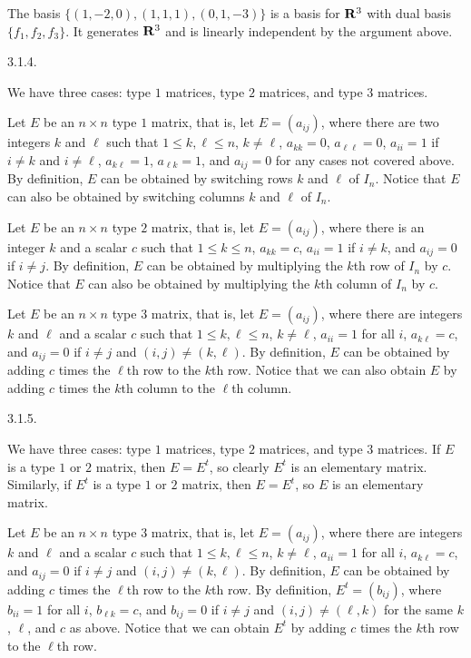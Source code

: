 The basis $\{(1,-2,0), (1,1,1), (0,1,-3)\}$ is a basis for ${\bf R} ^3$
with dual basis $\{f_1, f_2, f_3\}$.
It generates ${\bf R} ^3$ and is linearly independent by the argument above.
\bigskip
\item{3.1.4.}

We have three cases: type $1$ matrices,
type $2$ matrices, and type $3$ matrices.

Let $E$ be an $n \times n$ type $1$ matrix, that is, let $E = (a_{ij})$,
where there are two integers $k$ and $\ell$ such that $1 \le k,\ell \le n$,
$k \ne \ell$, $a_{kk} = 0$, $a_{\ell \ell} = 0$,
$a_{ii} = 1$ if $i \ne k$ and $i \ne \ell$,
$a_{k \ell} = 1$, $a_{\ell k} = 1$,
and $a_{ij} = 0$ for any cases not covered above.
By definition, $E$ can be obtained by switching rows $k$ and $\ell$ of $I_n$.
Notice that $E$ can also be obtained by switching
columns $k$ and $\ell$ of $I_n$.

Let $E$ be an $n \times n$ type $2$ matrix, that is, let $E = (a_{ij})$,
where there is an integer $k$ and a scalar $c$ such that $1 \le k \le n$,
$a_{kk} = c$, $a_{ii} = 1$ if $i \ne k$, and $a_{ij} = 0$ if $i \ne j$.
By definition, $E$ can be obtained by
multiplying the $k$th row of $I_n$ by $c$.
Notice that $E$ can also be obtained by
multiplying the $k$th column of $I_n$ by $c$.

Let $E$ be an $n \times n$ type $3$ matrix, that is, let $E = (a_{ij})$,
where there are integers $k$ and $\ell$ and a scalar $c$ such that
$1 \le k,\ell \le n$, $k \ne \ell$, $a_{ii} = 1$ for all $i$,
$a_{k \ell} = c$, and $a_{ij} = 0$ if $i \ne j$ and $(i,j) \ne (k,\ell)$.
By definition, $E$ can be obtained by adding
$c$ times the $\ell$th row to the $k$th row.
Notice that we can also obtain $E$ by adding
$c$ times the $k$th column to the $\ell$th column.
\bigskip
\item{3.1.5.}

We have three cases: type $1$ matrices,
type $2$ matrices, and type $3$ matrices.
If $E$ is a type $1$ or $2$ matrix,
then $E = E^t$, so clearly $E^t$ is an elementary matrix.
Similarly, if $E^t$ is a type $1$ or $2$ matrix,
then $E = E^t$, so $E$ is an elementary matrix.

Let $E$ be an $n \times n$ type $3$ matrix, that is, let $E = (a_{ij})$,
where there are integers $k$ and $\ell$ and a scalar $c$ such that
$1 \le k,\ell \le n$, $k \ne \ell$, $a_{ii} = 1$ for all $i$,
$a_{k \ell} = c$, and $a_{ij} = 0$ if $i \ne j$ and $(i,j) \ne (k,\ell)$.
By definition, $E$ can be obtained by adding
$c$ times the $\ell$th row to the $k$th row.
By definition, $E^t = (b_{ij})$, where $b_{ii} = 1$ for all $i$,
$b_{\ell k} = c$, and $b_{ij} = 0$ if $i \ne j$ and $(i,j) \ne (\ell, k)$
for the same $k$, $\ell$, and $c$ as above.
Notice that we can obtain $E^t$ by adding
$c$ times the $k$th row to the $\ell$th row.

